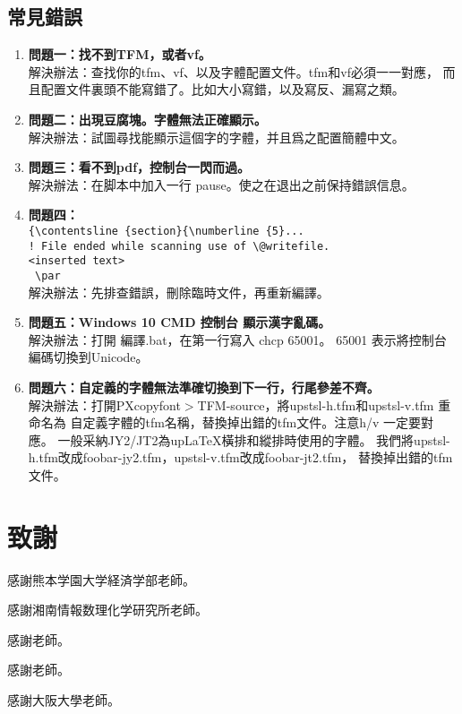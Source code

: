 \subsection{常見錯誤}
\begin{enumerate}
\item {\mc\bfseries{}問題一：找不到TFM，或者vf。}\\
解決辦法：查找你的tfm、vf、以及字體配置文件。tfm和vf必須一一對應，
而且配置文件裏頭不能寫錯了。比如大小寫錯，以及寫反、漏寫之類。

\item {\mc\bfseries{}問題二：出現豆腐塊。字體無法正確顯示。}\\
解決辦法：試圖尋找能顯示這個字的字體，并且爲之配置簡體中文。

\item {\mc\bfseries{}問題三：看不到pdf，控制台一閃而過。}\\
解決辦法：在脚本中加入一行 pause。使之在退出之前保持錯誤信息。

\item {\mc\bfseries{}問題四：}\\
\verb+{\contentsline {section}{\numberline {5}...+\\
\verb+! File ended while scanning use of \@writefile.+\\
\verb+<inserted text>+\\
\hspace{10zw}\verb+ \par +\\
解決辦法：先排查錯誤，刪除臨時文件，再重新編譯。
\item {\mc\bfseries{}問題五：Windows 10 CMD 控制台 顯示漢字亂碼。}\\
解決辦法：打開 {\color{red}編譯.bat}，在第一行寫入 {\color{red}chcp 65001}。
\hspace{.5zw}65001 表示將控制台編碼切換到Unicode。

\item {\mc\bfseries{}問題六：自定義的字體無法準確切換到下一行，行尾參差不齊。}\\
解決辦法：打開PXcopyfont$>$TFM-source，將upstsl-h.tfm和upstsl-v.tfm 重命名為
自定義字體的tfm名稱，替換掉出錯的tfm文件。注意h/v 一定要對應。
一般采納JY2/JT2為{up\LaTeX}橫排和縱排時使用的字體。
我們將upstsl-h.tfm改成foobar-jy2.tfm，upstsl-v.tfm改成foobar-jt2.tfm，
替換掉出錯的tfm文件。


\end{enumerate}

\section{致謝}
\par 感謝熊本学園大学経済学部老師。
\par 感謝湘南情報数理化学研究所老師。
\par 感謝老師。
\par 感謝老師。
\par 感謝大阪大學老師。

